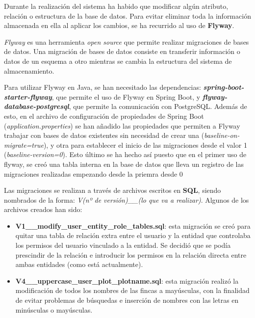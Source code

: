 Durante la realización del sistema ha habido que modificar algún atributo, relación o estructura de la base de datos. Para evitar eliminar toda la información 
almacenada en ella al aplicar los cambios, se ha recurrido al uso de \textbf{Flyway}.

\textit{Flyway} \cite{flyway} es una herramienta \textit{open source} que permite realizar migraciones de bases de datos. Una migración de bases de datos consiste en transferir
información o datos de un esquema a otro mientras se cambia la estructura del sistema de almacenamiento.

Para utilizar Flyway en Java, se han necesitado las dependencias: \textbf{\textit{spring-boot-starter-flyway}}, que permite el uso de Flyway en Spring Boot, y 
\textbf{\textit{flyway-database-postgresql}}, que permite la comunicación con PostgreSQL. Además de esto, en el archivo de configuración de propiedades de Spring Boot 
(\textit{application.properties}) se han añadido las propiedades que permiten a Flyway trabajar con bases de datos existentes sin necesidad de crear una 
(\textit{baseline-on-migrate=true}), y otra para establecer el inicio de las migraciones desde el valor 1 (\textit{baseline-version=0}). Esto último se ha hecho 
así puesto que en el primer uso de flyway, se creó una tabla interna en la base de datos que lleva un registro de las migraciones realizadas empezando desde la priemra 
desde 0

Las migraciones se realizan a través de archivos escritos en \textbf{SQL}, siendo nombrados de la forma: \textit{V(nº de versión)\_\_(lo que va a realizar)}. Algunos de los
archivos creados han sido:

\begin{itemize}
    \item \textbf{V1\_\_modify\_user\_entity\_role\_tables.sql}: esta migración se creó para quitar una tabla de relación extra entre el usuario y la entidad que controlaba los permisos
    del usuario vinculado a la entidad. Se decidió que se podía prescindir de la relación e introducir los permisos en la relación directa entre ambas entidades (como está actualmente).

    \item \textbf{V4\_\_uppercase\_user\_plot\_plotname.sql}: esta migración realizó la modificación de todos los nombres de las fincas a mayúsculas, con la finalidad de evitar problemas de 
    búsquedas e inserción de nombres con las letras en minúsculas o mayúsculas.
\end{itemize}

